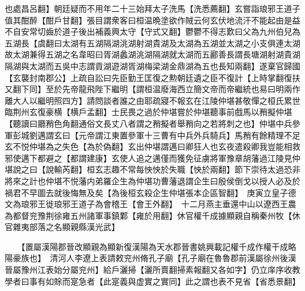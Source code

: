也處昌呂翻】朝廷疑而不用年二十三始拜太子洗馬【洗悉薦翻】玄嘗詣琅邪王道子值其酣醉【酣戶甘翻】張目謂衆客曰桓温晩塗欲作賊云何玄伏地流汗不能起由是益不自安常切齒於道子後出補義興太守【守式又翻】鬱鬱不得志歎曰父為九州伯兒為五湖長【虞翻曰太湖有五湖隔湖洮湖射湖貴湖及太湖為五湖並太湖之小支俱連太湖故太湖兼得五湖之名韋昭曰胥湖蠡湖洮湖隔湖就太湖而五酈善長謂長塘湖射湖貴湖隔湖與太湖而五吳中志謂貢湖遊湖胥湖梅梁湖金鼎湖為五也長知兩翻】遂棄官歸國【玄襲封南郡公】上疏自訟曰先臣勤王匡復之勲朝廷遺之臣不復計【上時掌翻復扶又翻下同】至於先帝龍飛陛下繼明【謂桓温廢海西立簡文帝而帝繼統也易曰明兩作離大人以繼明照四方】請問談者誰之由耶疏寢不報玄在江陵仲堪甚敬憚之桓氏累世臨荆州玄復豪横【横戶孟翻】士民畏之過於仲堪嘗於仲堪聽事前戲馬以矟擬仲堪【聽讀曰廳矟色角翻通俗文長丈八者謂之矟擬者舉矟向之若將刺之也】仲堪中兵參軍彭城劉邁謂玄曰【元帝謂江東置參軍十三曹有中兵外兵騎兵】馬矟有餘精理不足玄不悦仲堪為之失色【為於偽翻】玄出仲堪謂邁曰卿狂人也玄夜遣殺卿我豈能相救邪使邁下都避之【都謂建康】玄使人追之邁僅而獲免征虜將軍豫章胡藩過江陵見仲堪說之曰【說輸芮翻】桓玄志趣不常每怏怏於失職【怏於兩翻】節下崇待太過恐非將來之計也仲堪不悦藩内弟羅企生為仲堪功曹藩退謂企生曰殷侯倒戈以授人必及於禍君不早圖去就後悔無及矣【為後桓玄殺企生仲堪張本企區智翻】　庚寅立皇子德文為琅邪王徙琅邪王道子為會稽王【會王外翻】　十二月燕主垂還中山以遼西王農為都督兖豫荆徐雍五州諸軍事鎮鄴【雍於用翻】休官權千成據顯親自稱秦州牧【休官雜夷部落之名顯親縣漢光武】

　　【置屬漢陽郡晉改顯親為顯新復漢陽為天水郡晉書姚興載記權千成作權干成略陽豪族也】　清河人李遼上表請敕兖州脩孔子廟【孔子廟在魯魯郡前漢屬徐州後漢晉屬豫州江表始分屬兖州】給戶灑掃【灑所賣翻掃素報翻又各如字】仍立庠序收教學者曰事有如賖而寔急者【此寔義與虚實之實同】此之謂也表不見省【省悉景翻】

